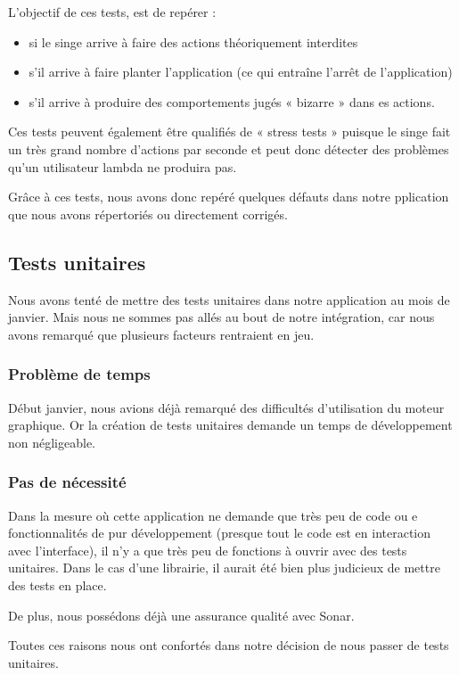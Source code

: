 \documentclass{report}
\begin{document}
L’objectif de ces tests, est de repérer :
\begin{itemize}
\item si le singe arrive à faire des actions théoriquement interdites
\item s’il arrive à faire planter l’application (ce qui entraîne l’arrêt
de l’application)
\item s’il arrive à produire des comportements jugés « bizarre » dans
es actions.
\end{itemize}
Ces tests peuvent également être qualifiés de « stress tests » puisque
le singe fait un très grand nombre d’actions par seconde et peut donc
détecter des problèmes qu’un utilisateur lambda ne produira pas.

Grâce à ces tests, nous avons donc repéré quelques défauts dans notre
pplication que nous avons répertoriés ou directement corrigés.

\subsection{Tests unitaires}
\bigskip


Nous avons tenté de mettre des tests unitaires dans notre application
au mois de janvier. Mais nous ne sommes pas allés au bout de notre
intégration, car nous avons remarqué que plusieurs facteurs rentraient
en jeu.

\subsubsection{Problème de temps}

Début janvier, nous avions déjà remarqué des difficultés d’utilisation
du moteur graphique. Or la création de tests unitaires demande un temps
de développement non négligeable.

\subsubsection{Pas de nécessité}

Dans la mesure où cette application ne demande que très peu de code ou
e fonctionnalités de pur développement (presque tout le code est en
interaction avec l’interface), il n’y a que très peu de fonctions à
ouvrir avec des tests unitaires. Dans le cas d’une librairie, il aurait
été bien plus judicieux de mettre des tests en place.

De plus, nous possédons déjà une assurance qualité avec Sonar.

Toutes ces raisons nous ont confortés dans notre décision de nous passer
de tests unitaires.
\end{document}
